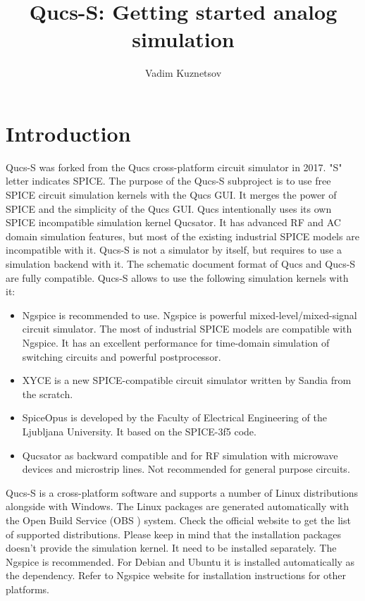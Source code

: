 \documentclass[a4paper,12pt]{article}
\title{Qucs-S: Getting started analog simulation}
\author{Vadim Kuznetsov}
\begin{document}
\maketitle



\section{Introduction} \label{sec:intro}

Qucs-S was forked from the Qucs cross-platform circuit simulator in 2017. "S" letter indicates SPICE. The purpose of the Qucs-S subproject is to use free SPICE circuit simulation kernels with the Qucs GUI. It merges the power of SPICE and the simplicity of the Qucs GUI. Qucs intentionally uses its own SPICE incompatible simulation kernel Qucsator. It has advanced RF and AC domain simulation features, but most of the existing industrial SPICE models are incompatible with it. Qucs-S is not a simulator by itself, but requires to use a simulation backend with it. The schematic document format of Qucs and Qucs-S are fully compatible. Qucs-S allows to use the following simulation kernels with it:

\begin{itemize}
 \item  Ngspice is recommended to use. Ngspice is powerful mixed-level/mixed-signal circuit simulator. The most of industrial SPICE models are compatible with Ngspice. It has an excellent performance for time-domain simulation of switching circuits and powerful postprocessor.
 \item XYCE is a new SPICE-compatible circuit simulator written by Sandia from the scratch. 
 \item SpiceOpus is developed by the Faculty of Electrical Engineering of the Ljubljana University. It based on the SPICE-3f5 code.
 \item Qucsator as backward compatible and for RF simulation with microwave devices and microstrip lines. Not recommended for general purpose circuits. 
\end{itemize}

Qucs-S is a cross-platform software and supports a number of Linux distributions alongside with Windows\texttrademark. The Linux packages are generated automatically with the Open Build Service (OBS ) system. Check the official website to get the list of supported distributions. Please keep in mind that the installation packages doesn't provide the simulation kernel. It need to be installed separately. The Ngspice is recommended. For Debian and Ubuntu it is installed automatically as the dependency. Refer to Ngspice website for installation instructions for other platforms.
\end{document}
